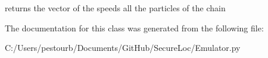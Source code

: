 \begin{DoxyVerb}returns the vector of the speeds all the particles of the chain \end{DoxyVerb}
 

The documentation for this class was generated from the following file\+:\begin{DoxyCompactItemize}
\item 
C\+:/\+Users/pestourb/\+Documents/\+Git\+Hub/\+Secure\+Loc/Emulator.\+py\end{DoxyCompactItemize}

